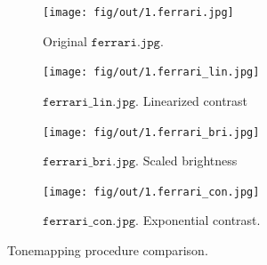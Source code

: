 \documentclass[tikz,14pt,fleqn]{article}
\begin{document}
\begin{figure}[h!]
\begin{center}
    \begin{subfigure}{0.38\textwidth}
        \centering
        \texttt{[image: fig/out/1.ferrari.jpg]}
        \caption{Original $\texttt{ferrari.jpg}$.}
    \end{subfigure}
    \begin{subfigure}{0.38\textwidth}
        \centering
        \texttt{[image: fig/out/1.ferrari\_lin.jpg]}
        \caption{$\texttt{ferrari\_lin.jpg}$. Linearized contrast}
        \label{fig:1.ferrari_lin}
    \end{subfigure}
    \begin{subfigure}{0.38\textwidth}
        \centering
        \texttt{[image: fig/out/1.ferrari\_bri.jpg]}
        \caption{$\texttt{ferrari\_bri.jpg}$. Scaled brightness}
        \label{fig:1.ferrari_bri}
    \end{subfigure}
    \begin{subfigure}{0.38\textwidth}
        \centering
        \texttt{[image: fig/out/1.ferrari\_con.jpg]}
        \caption{$\texttt {ferrari\_con.jpg}$. Exponential contrast.}
        \label{fig:1.ferrari_con}
    \end{subfigure}

    \caption{Tonemapping procedure comparison.}
    \label{fig:1.results}
\end{center}

\end{figure}
\end{document}
